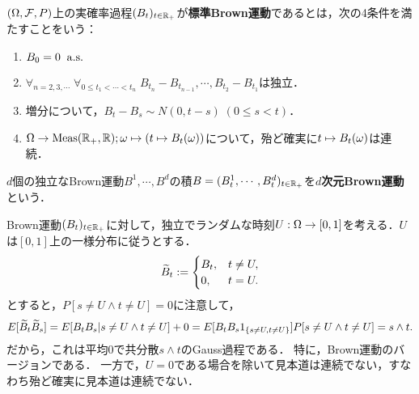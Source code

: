 \documentclass[uplatex,dvipdfmx]{jsreport}
\begin{document}
\begin{definition}
    $(\Omega,\mathcal{F},P)$上の実確率過程$(B_t)_{t\in\mathbb{R}_+}$が\textbf{標準Brown運動}であるとは，次の4条件を満たすことをいう：
    \begin{enumerate}[({B}1)]
        \item $B_0=0\;\;\mathrm{a.s.}$
        \item $\forall_{n=2,3,\cdots}\;\forall_{0\le t_1<\cdots<t_n}\;B_{t_n}-B_{t_{n-1}},\cdots,B_{t_2}-B_{t_1}$は独立．
        \item 増分について，$B_t-B_s\sim N(0,t-s)\;(0\le s<t)$．
        \item $\Omega\to\mathrm{Meas}(\mathbb{R}_+,\mathbb{R});\omega\mapsto(t\mapsto B_t(\omega))$について，殆ど確実に$t\mapsto B_t(\omega)$は連続．
    \end{enumerate}
    $d$個の独立なBrown運動$B^1,\cdots,B^d$の積$B=(B^1_t,\cdots,B^d_t)_{t\in\mathbb{R}_+}$を\textbf{$d$次元Brown運動}という．
\end{definition}
\begin{example}[Brown運動ではない例]
    Brown運動$(B_t)_{t\in\mathbb{R}_+}$に対して，独立でランダムな時刻$U:\Omega\to[0,1]$を考える．$U$は$[0,1]$上の一様分布に従うとする．
    \[\widetilde{B}_t:=\begin{cases}
        B_t,&t\ne U,\\
        0,&t=U.
    \end{cases}\]
    とすると，$P[s\ne U\land t\ne U]=0$に注意して，
    \[E[\widetilde{B}_t\widetilde{B}_s]=E[B_tB_s|s\ne U\land t\ne U]+0=E[B_tB_s1_{\left\{s\ne U,t\ne U\right\}}]P[s\ne U\land t\ne U]=s\land t.\]
    だから，これは平均$0$で共分散$s\land t$のGauss過程である．
    特に，Brown運動のバージョンである．
    一方で，$U=0$である場合を除いて見本道は連続でない，すなわち殆ど確実に見本道は連続でない．
\end{example}
\end{document}

